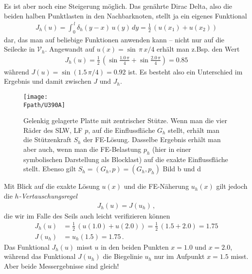 {Es ist aber noch eine Steigerung m\"{o}glich. Das gen\"{a}hrte Dirac Delta, also die beiden \glq halben\grq{} Punktlasten in den Nachbarknoten, stellt ja ein eigenes Funktional
\begin{align}
J_h(u) = \int_0^{\,l} \delta_h(y-x)\,u(y)\,dy = \frac{1}{2}\,(u(x_1) + u(x_2))
\end{align}
dar, das man auf beliebige Funktionen anwenden kann -- nicht nur auf die Seilecke in $\mathcal{V}_h$.
Angewandt auf $u(x)= \sin\,\pi\,x/4$ erh\"{a}lt man z.Bsp. den Wert
\begin{align}
J_h(u) = \frac{1}{2}\, (\sin \frac{1.0\,\pi}{4} + \sin \frac{2.0\,\pi}{4}) = 0.85
\end{align}
w\"{a}hrend $J(u) = \sin (1.5\,\pi/4) = 0.92$ ist. Es besteht also ein Unterschied im Ergebnis und damit zwischen $J$ und $J_h$.
\begin{figure}[tbp]
\centering
\if {} \sidecaption \fi
\texttt{[image: \\Fpath/U390A]}
\caption{Gelenkig gelagerte Platte mit zentrischer St\"{u}tze. Wenn man die vier R\"{a}der des SLW, LF $p$, auf die Einflussfl\"{a}che $G_h$ stellt, erh\"{a}lt man die St\"{u}tzenkraft $S_h$ der FE-L\"{o}sung. Dasselbe Ergebnis erh\"{a}lt man aber auch, wenn man die FE-Belastung $p_h$ (hier in einer symbolischen Darstellung als Blocklast) auf die exakte Einflussfl\"{a}che stellt. Ebenso gilt $S_h = (G_h,p) =  (G_h,p_h)$ Bild b und d} \label{U390}
\end{figure}%

Mit Blick auf die exakte L\"{o}sung $u(x)$ und die FE-N\"{a}herung $u_h(x)$ gilt jedoch die {\em $h$-Vertauschungsregel\/}
\begin{align}\label{Eq56}
\boxed{J_h(u) = J(u_h)}\,,
\end{align}
die wir im Falle des Seils auch leicht verifizieren k\"{o}nnen
\begin{align}
J_h(u) &= \frac{1}{2}\,(u(1.0) + u(2.0)  ) =  \frac{1}{2}\,(1.5 + 2.0) = 1.75 \\
 J(u_h) &= u_h(1.5) = 1.75\,.
\end{align}
Das Funktional $J_h(u)$ misst $u$ in den beiden Punkten $x = 1.0$ und $x = 2.0$, w\"{a}hrend das Funktional $J(u_h)$ die Biegelinie $u_h$ nur im Aufpunkt $x = 1.5$ misst. Aber beide Messergebnisse sind gleich!

}
